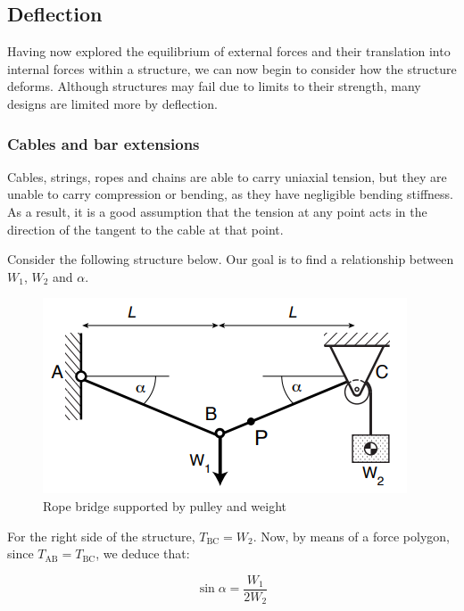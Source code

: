 \documentclass{article}
\begin{document}
\newpage

\subsection{Deflection}

Having now explored the equilibrium of external forces and their translation into internal forces within a structure, we can now begin to consider how the structure deforms. Although structures may fail due to limits to their strength, many designs are limited more by deflection. 

\subsubsection{Cables and bar extensions}

Cables, strings, ropes and chains are able to carry uniaxial tension, but they are unable to carry compression or bending, as they have negligible bending stiffness. As a result, it is a good assumption that the tension at any point acts in the direction of the tangent to the cable at that point.

\begin{example}
    Consider the following structure below. Our goal is to find a relationship between $W_1$, $W_2$ and $\alpha$.

    \begin{figure}[h]
        \centering
        \includegraphics{images/cable1.png}
        \caption{Rope bridge supported by pulley and weight}
        \label{fig:enter-label}
    \end{figure}

    For the right side of the structure, $T_{\text{BC}} = W_2$. Now, by means of a force polygon, since $T_{\text{AB}} = T_{\text{BC}}$, we deduce that:

    \[ \sin{\alpha} = \frac{W_1}{2W_2} \]
\end{example}
\end{document}
